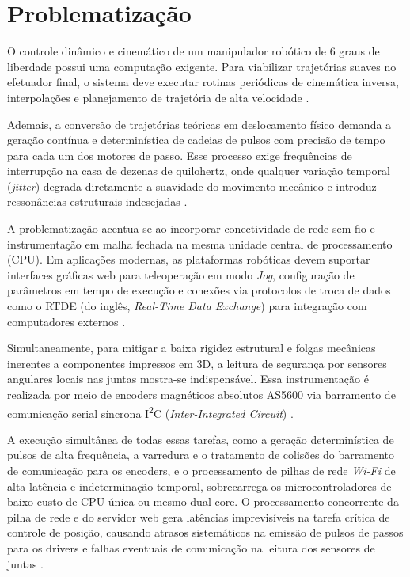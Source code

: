 \section{Problematização}
\label{sec:problematizacao}

O controle dinâmico e cinemático de um manipulador robótico de 6 graus de liberdade possui uma computação exigente. Para viabilizar trajetórias suaves no efetuador final, o sistema deve executar rotinas periódicas de cinemática inversa, interpolações e planejamento de trajetória de alta velocidade \cite{lynch2017modern}.

Ademais, a conversão de trajetórias teóricas em deslocamento físico demanda a geração contínua e determinística de cadeias de pulsos com precisão de tempo para cada um dos motores de passo. Esse processo exige frequências de interrupção na casa de dezenas de quilohertz, onde qualquer variação temporal (\textit{jitter}) degrada diretamente a suavidade do movimento mecânico e introduz ressonâncias estruturais indesejadas \cite{lewin2023scurve}.

A problematização acentua-se ao incorporar conectividade de rede sem fio e instrumentação em malha fechada na mesma unidade central de processamento (CPU). Em aplicações modernas, as plataformas robóticas devem suportar interfaces gráficas web para teleoperação em modo \textit{Jog}, configuração de parâmetros em tempo de execução e conexões via protocolos de troca de dados como o RTDE (do inglês, \textit{Real-Time Data Exchange}) para integração com computadores externos \cite{kowsalyadevi2025comprehensive}.

Simultaneamente, para mitigar a baixa rigidez estrutural e folgas mecânicas inerentes a componentes impressos em 3D, a leitura de segurança por sensores angulares locais nas juntas mostra-se indispensável. Essa instrumentação é realizada por meio de encoders magnéticos absolutos AS5600 via barramento de comunicação serial síncrona I\textsuperscript{2}C (\textit{Inter-Integrated Circuit}) \cite{tang2022research}.

A execução simultânea de todas essas tarefas, como a geração determinística de pulsos de alta frequência, a varredura e o tratamento de colisões do barramento de comunicação para os encoders, e o processamento de pilhas de rede \textit{Wi-Fi} de alta latência e indeterminação temporal, sobrecarrega os microcontroladores de baixo custo de CPU única ou mesmo dual-core. O processamento concorrente da pilha de rede e do servidor web gera latências imprevisíveis na tarefa crítica de controle de posição, causando atrasos sistemáticos na emissão de pulsos de passos para os drivers e falhas eventuais de comunicação na leitura dos sensores de juntas \cite{marton2009distributed}. 

